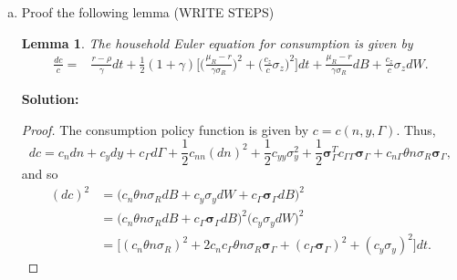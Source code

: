 \documentclass[11pt]{extarticle}
\theoremstyle{plain}
\newtheorem{lem}[thm]{Lemma}
\theoremstyle{definition}
\begin{document}
\begin{enumerate}[(a)]
\begin{proof}
	\begin{align*}
		dV_n = & - \bigg( V_n \frac{\mu_R - r}{\sigma_R^2 } + V_{n \Gamma} \frac{ \bm \sigma_\Gamma }{\sigma_R} \bigg) \sigma_R dB + V_{ny} \sigma_y dW + V_{n \Gamma}  \bm \sigma_\Gamma dB  \\
		&  + (\rho - r) V_n - V_n  \theta (\mu_R - r) + \bigg( V_n \frac{\mu_R - r}{\sigma_R^2 } + V_{n \Gamma} \frac{ \bm \sigma_\Gamma }{\sigma_R} \bigg) \theta  \sigma_R^2 - V_{n \Gamma} \theta \sigma_R  \bm \sigma_\Gamma. 
	\end{align*}
	Simplifying, 
	\begin{align*}
		dV_n = & -  V_n \frac{\mu_R - r}{\sigma_R} dB  - V_{n \Gamma}  \bm \sigma_\Gamma  dB + V_{ny} \sigma_y dW + V_{n \Gamma}  \bm \sigma_\Gamma dB  \\
		&  + (\rho - r) V_n - V_n  \theta (\mu_R - r) +  V_n (\mu_R - r)\theta + V_{n \Gamma}  \bm \sigma_\Gamma \theta  \sigma_R - V_{n \Gamma} \theta \sigma_R  \bm \sigma_\Gamma. 
	\end{align*}
	Combining terms yield the result. 
\end{proof}

\item Proof the following lemma (WRITE STEPS)

\begin{lem}
	
	The household Euler equation for consumption is given by
	\begin{align*}
		\frac{dc}{c} = & \frac{r - \rho}{\gamma} dt + \frac{1}{2} (1+\gamma) \bigg[ \bigg( \frac{\mu_R - r}{\gamma \sigma_R} \bigg)^2 + \bigg( \frac{c_z}{c} \sigma_z \bigg)^2 \bigg] dt +  \frac{\mu_R - r}{\gamma \sigma_R} dB  + \frac{c_z}{c} \sigma_z dW .
	\end{align*}	
\end{lem}

\textbf{Solution:}

\vspace{2mm}
\noindent
\begin{proof}
	
	The consumption policy function is given by $c = c(n, y, \Gamma)$. Thus, 
	\begin{equation*}
		dc = c_n dn + c_y dy + c_\Gamma d \Gamma  + \frac{1}{2} c_{nn} (dn)^2 + \frac{1}{2} c_{yy} \sigma_y^2 + \frac{1}{2} \bm \sigma_\Gamma^T c_{\Gamma \Gamma} \bm \sigma_\Gamma + c_{n \Gamma} \theta n \sigma_R \bm \sigma_\Gamma,
	\end{equation*}
	and so 
	\begin{align*}
		(dc)^2 &= \bigg( c_n \theta n \sigma_R dB + c_y \sigma_y dW + c_\Gamma \bm \sigma_\Gamma dB \bigg)^2 \\
		&= \bigg( c_n \theta n \sigma_R dB + c_\Gamma \bm \sigma_\Gamma dB \bigg)^2 \bigg( c_y \sigma_y dW \bigg)^2 \\
		&= \bigg[ (c_n \theta n \sigma_R)^2 + 2 c_n c_\Gamma \theta n \sigma_R \bm \sigma_\Gamma + (c_\Gamma \bm \sigma_\Gamma)^2 + (c_y \sigma_y)^2 \bigg] dt.
	\end{align*}
	

\end{proof}
\end{enumerate}
\end{document}
